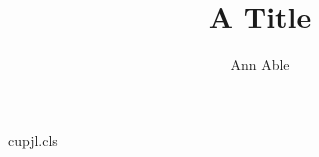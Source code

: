 \begin{filecontents*}[overwrite]{cupjl.cls}
\def\cj@corr{}\newcommand\corr[1]{\gdef\cj@corr{#1}}
\def\@maketitle{\begin{center}{\Large\@title\par}{\@author\par}{Corresponding: \cj@corr\par}\end{center}}
\g@addto@macro{\document}{\maketitle}
\end{filecontents*}
\documentclass{cupjl}
\title{A Title}
\author{Ann Able}

Text.


